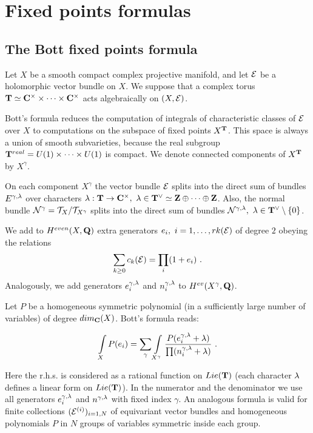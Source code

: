 \documentclass{amsart}
\begin{document}
\section{Fixed points formulas}

\subsection{The Bott fixed points formula}

 Let $X$ be a smooth compact complex projective manifold, and let $\mathcal E$  be
a
holomorphic vector bundle on $X$. We suppose that a complex torus
 $\mathbf T\simeq\mathbf C^{\times}\times \dots\times \mathbf C^{\times}$ acts algebraically on
$(X,\mathcal E)$.

Bott's formula reduces the computation of integrals of characteristic classes
of $\mathcal E$ over $X$ to
  computations on the subspace of fixed points $X^{\mathbf T}$.
  This space is always a union of smooth subvarieties,  because the real
subgroup $\mathbf T^{real}=U(1)\times\dots\times U(1)$ is compact.
We denote connected components of
$X^{\mathbf T}$ by $X^{\gamma}$.


On each component $X^{\gamma}$ the vector bundle $\mathcal E$
  splits into the direct sum of bundles $E^{\gamma,\lambda}$ over  characters
$\lambda:\mathbf T\to \mathbf C^{\times},\,\,\lambda\in\mathbf T^{\vee}\simeq\mathbf Z\oplus\dots\oplus\mathbf Z$. Also, the
normal bundle
 $\mathcal N^{\gamma}=\mathcal T_X/\mathcal T_{X^{\gamma}}$ splits into the direct sum of
bundles $\mathcal N^{\gamma,\lambda}, \,\,\lambda\in\mathbf T^{\vee}\setminus\{0\}$.


We add to $H^{even}(X,\mathbf Q)$ extra generators $e_i,\,\,i=1,\dots ,rk(\mathcal E)$ of
degree $2$  obeying the relations
 $$\sum_{k\ge 0}c_k(\mathcal E)=\prod_{i}(1+e_i)\,\,.$$ Analogously, we add
generators $e^{\gamma,\lambda}_i$
 and $n^{\gamma,\lambda}_i$ to $H^{ev}(X^{\gamma},\mathbf Q)$.

Let $P$ be a homogeneous symmetric polynomial (in a sufficiently large number
of variables) of degree $dim_{\mathbf C}(X)$. Bott's formula reads:

$$\int\limits_{X} P(e_i)=\sum_{\gamma}\int\limits_{X^{\gamma}}
 \frac{P(e^{\gamma,\lambda}_i+\lambda)}{\prod (n^{\gamma,\lambda}_i+\lambda)}\,\,.$$

Here the r.h.s. is considered as a rational function on $Lie(\mathbf T)$
 (each character $\lambda$ defines a linear form on $Lie(\mathbf T)$).
 In the numerator and the denominator we use all generators $e^{\gamma,\lambda}_i$
 and $n^{\gamma,\lambda}$ with fixed index $\gamma$.
An analogous  formula is valid for finite collections $(\mathcal E^{(i)})_{i=1,N}$
of equivariant vector bundles and homogeneous polynomials $P$ in $N$ groups of
variables symmetric inside each group.
\end{document}
